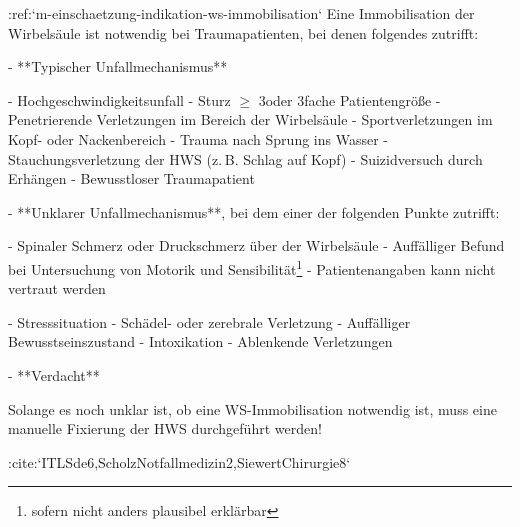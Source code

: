 :ref:`m-einschaetzung-indikation-ws-immobilisation`
\label{proc:YY14200B}
Eine Immobilisation der Wirbelsäule ist notwendig bei
Traumapatienten, bei denen folgendes zutrifft:

\begin{enumerate}
  -   **Typischer Unfallmechanismus**
  \begin{compactitem}
    -   Hochgeschwindigkeitsunfall
    -   Sturz $\geq$ 3\Meter* oder 3fache Patientengröße
    -   Penetrierende Verletzungen im Bereich der
    Wirbelsäule
    -   Sportverletzungen im Kopf- oder Nackenbereich
    -   Trauma nach Sprung ins Wasser
    -   Stauchungsverletzung der HWS (z. B. Schlag auf
    Kopf)
    -   Suizidversuch durch Erhängen
    -   Bewusstloser Traumapatient
  \end{compactitem}
  -   **Unklarer Unfallmechanismus**, bei dem einer der
  folgenden Punkte zutrifft:
  \begin{compactitem}
    -   Spinaler Schmerz oder Druckschmerz über der
    Wirbelsäule
    -   Auffälliger Befund bei Untersuchung von Motorik
    und Sensibilität\footnote{sofern nicht anders plausibel
    erklärbar}
    -   Patientenangaben kann nicht vertraut
    werden
    \begin{compactitem}
      -   Stresssituation
      -   Schädel- oder zerebrale Verletzung
      -   Auffälliger Bewusstseinszustand
      -   Intoxikation
      -   Ablenkende Verletzungen
    \end{compactitem}
  \end{compactitem}
  -   **Verdacht**
\end{enumerate}

\noindent Solange es noch unklar ist, ob eine WS-Immobilisation
notwendig ist, muss eine manuelle Fixierung der HWS
durchgeführt werden!

:cite:`ITLSde6,ScholzNotfallmedizin2,SiewertChirurgie8`\ 